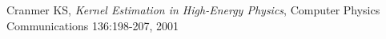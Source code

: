 \begin{thebibliography}{9}
		Cranmer KS, 
		\textit{Kernel Estimation in High-Energy Physics},
		Computer Physics Communications 136:198-207,
		2001
\end{thebibliography}
